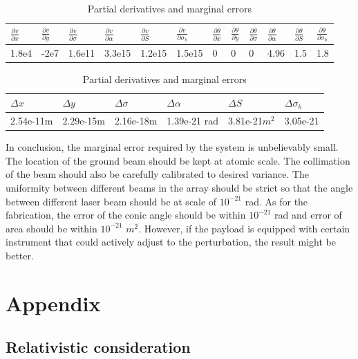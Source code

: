 \documentclass{article}
\begin{document}
		\begin{table}[!htb]
		\centering
		\label{pd}
		\caption{Partial derivatives and marginal errors}
		\begin{tabular}{llllllllllll}
			\toprule
			$\frac{\partial v}{\partial x}$ &$\frac{\partial v}{\partial y}$ &$\frac{\partial v}{\partial \sigma}$ &$\frac{\partial v}{\partial \alpha}$ &$\frac{\partial v}{\partial S}$ &$\frac{\partial v}{\partial \sigma_b}$& $\frac{\partial \theta}{\partial x}$ &$\frac{\partial \theta}{\partial y}$ &$\frac{\partial \theta}{\partial \sigma}$ &$\frac{\partial \theta}{\partial \alpha}$ &$\frac{\partial \theta}{\partial S}$ &$\frac{\partial \theta}{\partial \sigma_b}$	\\
			\midrule
			1.8e4 &	-2e7	& 1.6e11	& 3.3e15	&1.2e15	& 1.5e15 &0&0	&0 &4.96 &1.5	&1.8	\\
			\bottomrule
		\end{tabular}
		\begin{tabular}{llllll}
			\\
			\toprule
			$\Delta x$ & $\Delta y$ & $\Delta \sigma$ & $\Delta \alpha$ & $\Delta S$ & $\Delta \sigma_b$ \\
			\midrule
			2.54e-11m	&2.29e-15m	&2.16e-18m	&1.39e-21 rad	&3.81e-21$m^2$	&3.05e-21	\\
			\bottomrule
		\end{tabular}
	\end{table}
	
	In conclusion, the marginal error required by the system is unbelievably small. The location of the ground beam should be kept at atomic scale. The collimation of the beam should also be carefully calibrated to desired variance. The uniformity between different beams in the array should be strict so that the angle between different laser beam should be at scale of $10^{-21}$ rad. As for the fabrication, the error of the conic angle should be within $10^{-21}$ rad and error of area should be within $10^{-21}\,\,m^2$. However, if the payload is equipped with certain instrument that could actively adjust to the perturbation, the result might be better.
	


\section{Appendix}
\subsection{Relativistic consideration}
\end{document}
